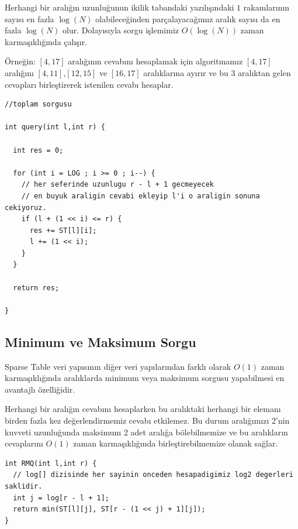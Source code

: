 \documentclass[12pt]{article}
\begin{document}
    Herhangi bir aral{\i}\u{g}{\i}n uzunlu\u{g}unun ikilik tabandaki yaz{\i}l{\i}\c{s}{\i}ndaki $1$ rakamlar{\i}n{\i}n say{\i}s{\i} en fazla $\log(N)$ olabilece\u{g}inden par\c{c}alayaca\u{g}{\i}m{\i}z aral{\i}k say{\i}s{\i} da en fazla $\log(N)$ olur. Dolay{\i}s{\i}yla sorgu i\c{s}lemimiz $O(\log(N))$ zaman karma\c{s}{\i}kl{\i}\u{g}{\i}nda \c{c}al{\i}\c{s}{\i}r. 
    
    \"{O}rne\u{g}in: $[4,17]$ aral{\i}\u{g}{\i}n{\i}n cevab{\i}n{\i} hesaplamak i\c{c}in algoritmam{\i}z $[4,17]$ aral{\i}\u{g}{\i}n{\i} $[4,11]$,$[12,15]$ ve $[16,17]$ aral{\i}klar{\i}na ay{\i}r{\i}r ve bu $3$ aral{\i}ktan gelen cevaplar{\i} birle\c{s}tirerek istenilen cevab{\i} hesaplar.
    
    \begin{verbatim}
//toplam sorgusu

int query(int l,int r) {

  int res = 0;

  for (int i = LOG ; i >= 0 ; i--) {
    // her seferinde uzunlugu r - l + 1 gecmeyecek
    // en buyuk araligin cevabi ekleyip l'i o araligin sonuna cekiyoruz.
    if (l + (1 << i) <= r) {
      res += ST[l][i];
      l += (1 << i);
    }
  }

  return res;

}
    \end{verbatim}    

    \subsection{Minimum ve Maksimum Sorgu}
    
    Sparse Table veri yap{\i}s{\i}n{\i}n di\u{g}er veri yap{\i}lar{\i}ndan farkl{\i} olarak $O(1)$ zaman karma\c{s}{\i}kl{\i}\u{g}{\i}nda aral{\i}klarda  minimum veya maksimum sorgusu yapabilmesi en avantajl{\i} \"{o}zelli\u{g}idir.

    Herhangi bir aral{\i}\u{g}{\i}n cevab{\i}n{\i} hesaplarken bu aral{\i}ktaki herhangi bir eleman{\i} birden fazla kez de\u{g}erlendirmemiz cevab{\i} etkilemez. Bu durum aral{\i}\u{g}{\i}m{\i}z{\i} 2'nin kuvveti uzunlu\u{g}unda maksimum 2 adet aral{\i}\u{g}a b\"{o}lebilmemize ve bu aral{\i}klar{\i}n cevaplar{\i}n{\i} $O(1)$ zaman karma\c{s}{\i}kl{\i}\u{g}{\i}nda birle\c{s}tirebilmemize olanak sa\u{g}lar.
    
    \begin{verbatim}
int RMQ(int l,int r) {
  // log[] dizisinde her sayinin onceden hesapadigimiz log2 degerleri saklidir.
  int j = log[r - l + 1];
  return min(ST[l][j], ST[r - (1 << j) + 1][j]);  
}
    \end{verbatim}
    
\end{document}

